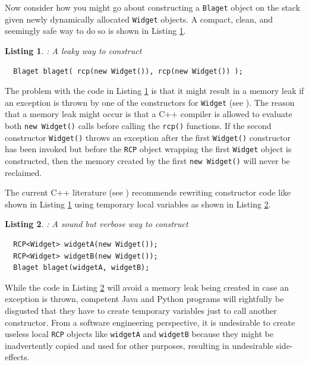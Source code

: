 \documentclass[pdf,ps2pdf,11pt]{SANDreport}
\newtheorem{listing}{Listing}
\begin{document}
Now consider how you might go about constructing a {}\texttt{Blaget}
object on the stack given newly dynamically allocated
{}\texttt{Widget} objects.  A compact, clean, and seemingly safe way
to do so is shown in Listing {}\ref{listing:BlagetConstruct1}.

\begin{listing}: A leaky way to construct \\
\label{listing:BlagetConstruct1}
{\small\begin{verbatim}
  Blaget blaget( rcp(new Widget()), rcp(new Widget()) );
\end{verbatim}}
\end{listing}

The problem with the code in Listing {}\ref{listing:BlagetConstruct1}
is that it might result in a memory leak if an exception is thrown by
one of the constructors for {}\texttt{Widget} (see {}\cite[Item
13]{C++CodingStandards05}).  The reason that a memory leak might occur
is that a C++ compiler is allowed to evaluate both {}\texttt{new
Widget()} calls before calling the {}\texttt{rcp()} functions.
If the second constructor {}\texttt{Widget()} throws an exception
after the first {}\texttt{Widget()} constructor has been invoked
but before the {}\texttt{RCP} object wrapping the first
{}\texttt{Widget} object is constructed, then the memory created by
the first {}\texttt{new Widget()} will never be reclaimed.

The current C++ literature (see {}\cite[Item
13]{C++CodingStandards05}) recommends rewriting constructor code like
shown in Listing {}\ref{listing:BlagetConstruct1} using temporary local
variables as shown in Listing {}\ref{listing:BlagetConstruct2}.

\begin{listing}: A sound but verbose way to construct \\
\label{listing:BlagetConstruct2}
{\small\begin{verbatim}
  RCP<Widget> widgetA(new Widget());
  RCP<Widget> widgetB(new Widget());
  Blaget blaget(widgetA, widgetB);
\end{verbatim}}
\end{listing}

While the code in Listing {}\ref{listing:BlagetConstruct2} will avoid a
memory leak being created in case an exception is thrown, competent
Java and Python programs will rightfully be disgusted that they have
to create temporary variables just to call another constructor.  From
a software engineering perspective, it is undesirable to create
useless local {}\texttt{RCP} objects like {}\texttt{widgetA} and
{}\texttt{widgetB} because they might be inadvertently copied and used
for other purposes, resulting in undesirable side-effects.
\end{document}
